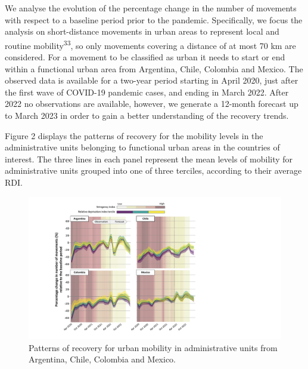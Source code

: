 \documentclass[
  11pt,
]{article}
\begin{document}
We analyse the evolution of the percentage change in the number of
movements with respect to a baseline period prior to the pandemic.
Specifically, we focus the analysis on short-distance movements in urban
areas to represent local and routine mobility\textsuperscript{33}, so
only movements covering a distance of at most 70 km are considered. For
a movement to be classified as urban it needs to start or end within a
functional urban area from Argentina, Chile, Colombia and Mexico. The
observed data is available for a two-year period starting in April 2020,
just after the first wave of COVID-19 pandemic cases, and ending in
March 2022. After 2022 no observations are available, however, we
generate a 12-month forecast up to March 2023 in order to gain a better
understanding of the recovery trends.

Figure 2 displays the patterns of recovery for the mobility levels in
the administrative units belonging to functional urban areas in the
countries of interest. The three lines in each panel represent the mean
levels of mobility for administrative units grouped into one of three
terciles, according to their average RDI.

\begin{figure}

{\centering \includegraphics{figures/prediction-rdi-band.pdf}

}

\caption{Patterns of recovery for urban mobility in administrative units
from Argentina, Chile, Colombia and Mexico.}

\end{figure}
\end{document}
